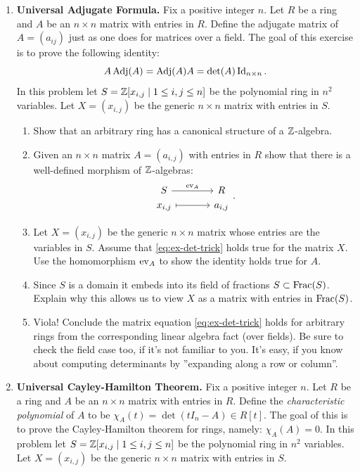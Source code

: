\documentclass[Notebook.tex]{subfiles}
\begin{document}
\begin{enumerate}[leftmargin=*, resume=problems]
\item \textbf{Universal Adjugate Formula.} Fix a positive integer $n$. Let $R$ be a ring and $A$ be an $n \times n$ matrix with entries in $R$. Define the adjugate matrix of $A=(a_{ij})$ just as one does for matrices over a field. The goal of this exercise is to prove the following identity:
\begin{equation}\label{eq:ex-det-trick}
A\operatorname{\text{Adj}}(A) = \operatorname{\text{Adj}}(A)A=\det(A)\operatorname{Id}_{n\times n}.
\end{equation}
In this problem let $S=\mathbb Z[x_{i,j}\mid 1\leq i,j\leq n]$ be the polynomial ring in $n^2$ variables. Let $X=(x_{i,j})$ be the generic $n\times n$ matrix with entries in $S$.
\begin{enumerate} 
\item Show that an arbitrary ring has a canonical structure of a $\mathbb Z$-algebra.
\item Given an $n \times n$ matrix $A=(a_{i,j})$ with entries in $R$ show that there is a well-defined morphism of $\mathbb Z$-algebras:
\[
\begin{tikzcd}[row sep = .3em, column sep = 3.5em]
S \arrow[r, "\ev_{A}"] & R \\
x_{i,j} \arrow[r, mapsto] & a_{i,j}
\end{tikzcd}.
\]
\item Let $X=(x_{i,j})$ be the generic $n\times n$ matrix whose entries are the variables in $S$. Assume that \eqref{eq:ex-det-trick} holds true for the matrix $X$. Use the homomorphism $\operatorname{ev}_{A}$ to show the identity holds true for $A$. 
\item Since $S$ is a domain it embeds into its field of fractions $S \subset \text{Frac}(S)$. Explain why this allows us to view $X$ as a matrix with entries in $\text{Frac}(S)$. 
\item Viola! Conclude the matrix equation \eqref{eq:ex-det-trick} holds for arbitrary rings from the corresponding linear algebra fact (over fields). Be sure to check the field case too, if it’s not familiar to you. It’s easy, if you know about computing determinants by ”expanding along a row or column''.
\end{enumerate}

\item \textbf{Universal Cayley-Hamilton Theorem.} Fix a positive integer $n$. Let $R$ be a ring and $A$ be an $n \times n$ matrix with entries in $R$. Define the \emph{characteristic polynomial} of $A$ to be $\chi_{A}(t)=\det(tI_n-A)\in R[t]$. The goal of this is to prove the Cayley-Hamilton theorem for rings, namely: $\chi_{A}(A)=0$. In this problem let $S=\mathbb Z[x_{i,j}\mid 1\leq i,j\leq n]$ be the polynomial ring in $n^2$ variables. Let $X=(x_{i,j})$ be the generic $n\times n$ matrix with entries in $S$.


\end{enumerate}
\end{document}
